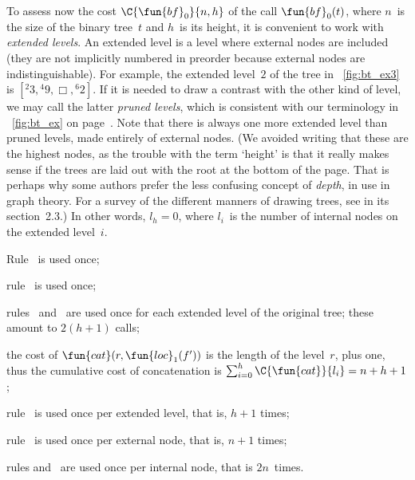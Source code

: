 To assess now the cost
\(\C{\fun{bf}_0}{n,h}\) of the call
\(\fun{bf}_0(t)\), where \(n\)~is the size of the binary tree~\(t\)
and \(h\)~is its height, it is convenient to
work with \emph{extended levels}. An
extended level is a level where external nodes are included (they are
not implicitly numbered in preorder because external nodes are
indistinguishable). For example, the extended level~\(2\) of the tree
in \fig~\vref{fig:bt_ex3} is \([{}^{2}{3}, {}^{4}{9}, \Box,
{}^{6}{2}]\). If it is needed to draw a contrast with the other kind
of level, we may call the latter \emph{pruned levels}, which is
consistent with our terminology in \fig~\ref{fig:bt_ex} on
page~\pageref{fig:bt_ex}. Note that there is always one more extended
level than pruned levels, made entirely of external nodes. (We avoided
writing that these are the highest nodes, as the trouble with the term
`height' is that it really makes sense if the trees
are laid out with the root at the bottom of the page. That is perhaps
why some authors prefer the less confusing concept of
\emph{depth}, in use in graph theory. For a
survey of the different manners of drawing trees, see
\cite{Knuth_1997} in its section~2.3.) In other words, \(l_h=0\),
where \(l_i\)~is the number of internal nodes on the extended
level~\(i\).
\begin{itemize*}

  \item Rule~\clause{\iota} is used once;

  \item rule~\clause{\kappa} is used once;

  \item rules~\clause{\lambda} and~\clause{\mu} are used once for each
    extended level of the original tree; these amount to \(2(h+1)\)
    calls;

  \item the cost of \(\fun{cat}(r,\fun{loc}_1(f'))\) is the length of
    the level~\(r\), plus one, thus the cumulative cost of concatenation
    is \(\sum_{i=0}^{h}\C{\fun{cat}}{l_i} = n + h + 1\);

  \item rule~\clause{\epsilon} is used once per extended level, that
    is, \(h+1\) times;

  \item rule~\clause{\zeta} is used once per external node, that is,
    \(n+1\) times;

  \item rules \clause{\eta} and~\clause{\theta} are used once per
    internal node, that is \(2n\)~times.

\end{itemize*}
